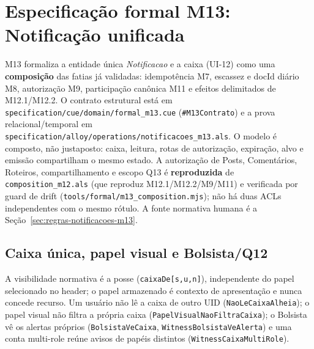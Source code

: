 \clearpage
\section{Especificação formal M13: Notificação unificada}
\label{sec:formal-m13}
\sloppy

M13 formaliza a entidade única \textit{Notificacao} e a caixa (UI-12) como uma
\textbf{composição} das fatias já validadas: idempotência M7, escassez e docId
diário M8, autorização M9, participação canônica M11 e efeitos delimitados de
M12.1/M12.2. O contrato estrutural está em
\texttt{specification/cue/domain/formal\_m13.cue} (\texttt{\#M13Contrato}) e a
prova relacional/temporal em
\texttt{specification/alloy/operations/notificacoes\_m13.als}. O modelo é
composto, não justaposto: caixa, leitura, rotas de autorização, expiração, alvo e
emissão compartilham o mesmo estado. A autorização de Posts, Comentários,
Roteiros, compartilhamento e escopo Q13 é \textbf{reproduzida} de
\texttt{composition\_m12.als} (que reproduz M12.1/M12.2/M9/M11) e verificada por
guard de drift (\texttt{tools/formal/m13\_composition.mjs}); não há duas ACLs
independentes com o mesmo rótulo. A fonte normativa humana é a
Seção~\ref{sec:regras-notificacoes-m13}.

\subsection*{Caixa única, papel visual e Bolsista/Q12}
A visibilidade normativa é a posse (\texttt{caixaDe[s,u,n]}), independente do
papel selecionado no header; o papel armazenado é contexto de apresentação e
nunca concede recurso. Um usuário não lê a caixa de outro UID
(\texttt{NaoLeCaixaAlheia}); o papel visual não filtra a própria caixa
(\texttt{PapelVisualNaoFiltraCaixa}); o Bolsista vê os alertas próprios
(\texttt{BolsistaVeCaixa}, \texttt{WitnessBolsistaVeAlerta}) e uma conta
multi-role reúne avisos de papéis distintos (\texttt{WitnessCaixaMultiRole}).

